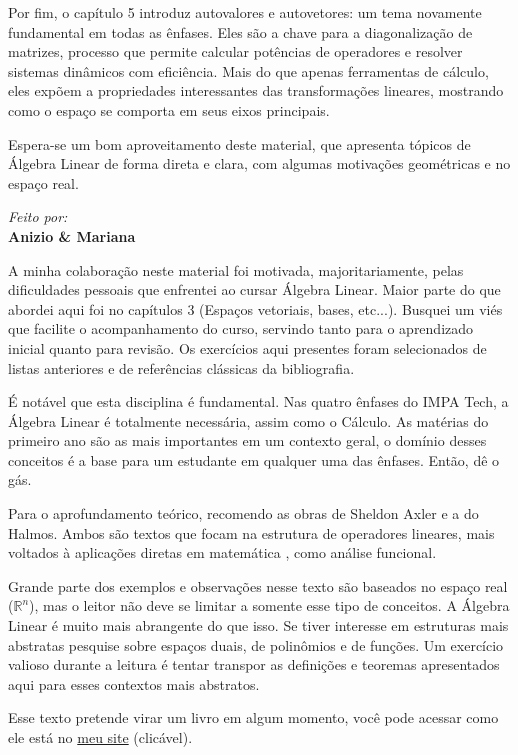 \documentclass[../main.tex]{subfiles}
\begin{document}
	Por fim, o capítulo 5 introduz autovalores e autovetores: um tema novamente fundamental em todas as ênfases. Eles são a chave para a diagonalização de matrizes, processo que permite calcular potências de operadores e resolver sistemas dinâmicos com eficiência. Mais do que apenas ferramentas de cálculo, eles expõem a propriedades interessantes das transformações lineares, mostrando como o espaço se comporta em seus eixos principais.
	
	Espera-se um bom aproveitamento deste material, que apresenta tópicos de Álgebra Linear de forma direta e clara, com algumas motivações geométricas e no espaço real.
	\vfill 
	\begin{flushright}
		\textit{Feito por:}\\
		\textbf{Anizio \& Mariana}
	\end{flushright}
	
	\newpage
	A minha colaboração neste material foi motivada, majoritariamente, pelas dificuldades pessoais que enfrentei ao cursar Álgebra Linear. Maior parte do que abordei aqui foi no capítulos 3 (Espaços vetoriais, bases, etc...). Busquei um viés que facilite o acompanhamento do curso, servindo tanto para o aprendizado inicial quanto para revisão. Os exercícios aqui presentes foram selecionados de listas anteriores e de referências clássicas da bibliografia.
	
	É notável que esta disciplina é fundamental. Nas quatro ênfases do IMPA Tech, a Álgebra Linear é totalmente necessária, assim como o Cálculo. As matérias do primeiro ano são as mais importantes em um contexto geral, o domínio desses conceitos é a base para um estudante em qualquer uma das ênfases. Então, dê o gás.
	
	Para o aprofundamento teórico, recomendo as obras de Sheldon Axler e a do Halmos. Ambos são textos que focam na estrutura de operadores lineares, mais voltados à aplicações diretas em matemática , como análise funcional. 
	
	Grande parte dos exemplos e observações nesse texto são baseados no espaço real ($\mathbb{R}^n$), mas o leitor não deve se limitar a somente esse tipo de conceitos. A Álgebra Linear é muito mais abrangente do que isso. Se tiver interesse em estruturas mais abstratas pesquise sobre espaços duais, de polinômios e de funções. Um exercício valioso durante a leitura é tentar transpor as definições e teoremas apresentados aqui para esses contextos mais abstratos.
	
	Esse texto pretende virar um livro em algum momento, você pode acessar como ele está no \href{https://sites.google.com/view/anizio}{meu site} (clicável).
	
\end{document}
